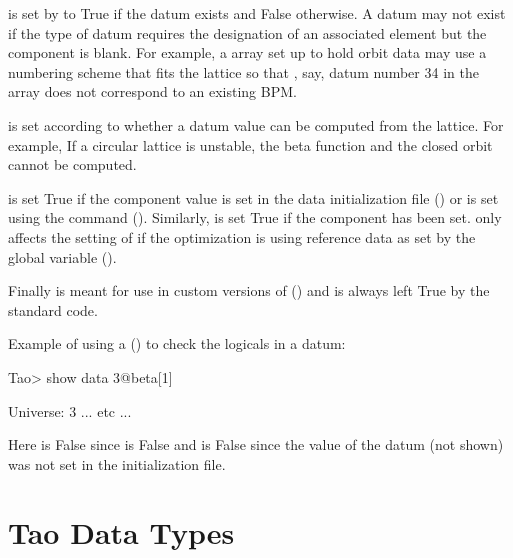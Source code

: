  is set by \tao to True if the datum exists and False
otherwise. A datum may not exist if the type of datum requires the
designation of an associated element but the  component
is blank. For example, a  array set up to hold orbit data
may use a numbering scheme that fits the lattice so that , say, datum
number 34 in the array does not correspond to an existing BPM.

 is set according to whether a datum value can be
computed from the  lattice. For example, If a circular
lattice is unstable, the beta function and the closed orbit cannot be
computed.

 is set True if the  component value is set in
the data initialization file () or is set using the
 command (). Similarly,  is set True
if the  component has been set.  only affects the
setting of  if the optimization is using reference data
as set by the global variable  ().

Finally  is meant for use in custom versions of \tao
() and is always left True by the standard \tao code.

Example of using a  () to check the logicals
in a datum:
\begin{example}
  Tao> show data 3@beta[1]

  Universe:   3
      ... etc ...
\end{example}
Here  is False since  is False and
 is False since the  value of the datum (not
shown) was not set in the \tao initialization file.

\section{Tao Data Types}
\label{s:data.types}

